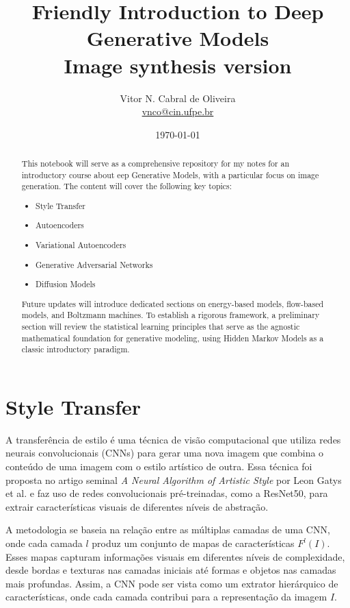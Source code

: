 \documentclass{tufte-handout}
\title{Friendly Introduction to Deep Generative Models\\
Image synthesis version}
\author{Vitor N. Cabral de Oliveira\\ \href{mailto:vnco@cin.ufpe.br}{vnco@cin.ufpe.br}}
\date{\today}
\begin{document}
\maketitle

\begin{abstract}
   This notebook will serve as a comprehensive repository for my notes for an introductory course about 
   eep Generative Models, with a particular focus on image generation. 
   The content will cover the following key topics:
    \begin{itemize}
    \item Style Transfer
    \item Autoencoders
    \item Variational Autoencoders
    \item Generative Adversarial Networks
    \item Diffusion Models
   \end{itemize}
   Future updates will introduce dedicated sections on energy-based models, flow-based models, and Boltzmann machines. 
   To establish a rigorous framework, a preliminary section will review the statistical learning principles that serve as the agnostic 
   mathematical foundation for generative modeling, using Hidden Markov Models as a classic introductory paradigm.
\end{abstract}

\newpage
\hypersetup{linkcolor=wp-text}
\tableofcontents
\hypersetup{linkcolor=wp-primary}
\newpage

\section{Style Transfer}

A transferência de estilo é uma técnica de visão computacional que utiliza redes neurais convolucionais (CNNs) para gerar uma nova imagem que combina o conteúdo de uma imagem com o estilo artístico de outra. Essa técnica foi proposta no artigo seminal \textit{A Neural Algorithm of Artistic Style} por Leon Gatys et al. e faz uso de redes convolucionais pré-treinadas, como a ResNet50, para extrair características visuais de diferentes níveis de abstração.

A metodologia se baseia na relação entre as múltiplas camadas de uma CNN, onde cada camada $l$ produz um conjunto de mapas de características $F^{l}(I)$. Esses mapas capturam informações visuais em diferentes níveis de complexidade, desde bordas e texturas nas camadas iniciais até formas e objetos nas camadas mais profundas. Assim, a CNN pode ser vista como um extrator hierárquico de características, onde cada camada contribui para a representação da imagem $I$.
\end{document}
